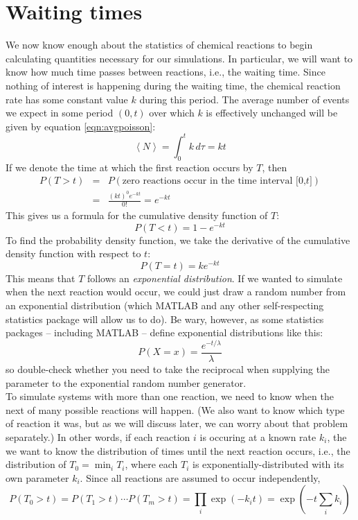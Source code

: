 \documentclass{article}
\begin{document}
\section*{Waiting times}
We now know enough about the statistics of chemical reactions to begin calculating quantities necessary for our simulations. In particular, we will want to know how much time passes between reactions, i.e., the waiting time. Since nothing of interest is happening during the waiting time, the chemical reaction rate has some constant value $k$ during this period. The average number of events we expect in some period $(0,t)$ over which $k$ is effectively unchanged will be given by equation \ref{eqn:avgpoisson}:
\[ \left< N \right> = \int_0^t k \, d\tau = kt \]
If we denote the time at which the first reaction occurs by $T$, then
\begin{eqnarray*}
P(T > t) & = & P(\textrm{zero reactions occur in the time interval [0,$t$]})\\
& = & \frac{(kt)^0 e^{-kt}}{0!} = e^{-kt}
\end{eqnarray*}
This gives us a formula for the cumulative density function of $T$:
\[ P(T <  t) = 1 - e^{-kt} \]
To find the probability density function, we take the derivative of the cumulative density function with respect to $t$:
\[ P(T = t) = k e^{-kt} \]
This means that $T$ follows an \textit{exponential distribution}. If we wanted to simulate when the next reaction would occur, we could just draw a random number from an exponential distribution (which MATLAB and any other self-respecting statistics package will allow us to do). Be wary, however, as some statistics packages -- including MATLAB -- define exponential distributions like this:
\[ P(X = x) = \frac{ e^{-t/\lambda}}{\lambda} \]
so double-check whether you need to take the reciprocal when supplying the parameter to the exponential random number generator.\\

To simulate systems with more than one reaction, we need to know when the next of many possible reactions will happen. (We also want to know which type of reaction it was, but as we will discuss later, we can worry about that problem separately.) In other words, if each reaction $i$ is occuring at a known rate $k_i$, the we want to know the distribution of times until the next reaction occurs, i.e.,  the distribution of $T_0 = \min_{i} T_i$, where each $T_i$ is exponentially-distributed with its own parameter $k_i$. Since all reactions are assumed to occur independently,
\[ P\left( T_0 > t \right) = P\left( T_1 > t \right)\cdots P\left( T_m > t \right) = \prod_i  \exp \left( -k_i t \right) = \exp \left( -t \sum_i k_i \right) \]
\end{document}
